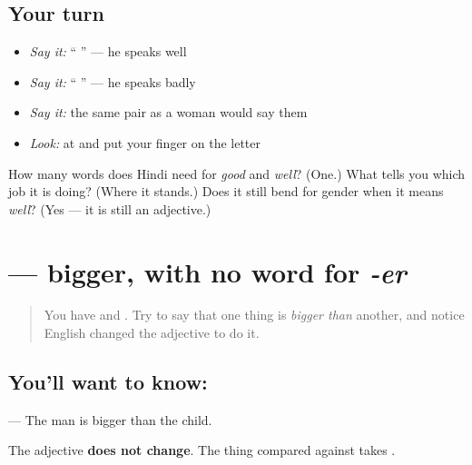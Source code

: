 \subsection*{Your turn}
\begin{itemize}
\raggedright
  \item \emph{Say it:} \textquotedblleft{}   \textquotedblright{} — he speaks well
  \item \emph{Say it:} \textquotedblleft{}   \textquotedblright{} — he speaks badly
  \item \emph{Say it:} the same pair as a woman would say them
  \item \emph{Look:} at  and put your finger on the letter \textbf{}
\end{itemize}

\begin{tcolorbox}[breakable,colback=teal!4,colframe=teal!35!black,title={Before you move on}]
How many words does Hindi need for \emph{good} and \emph{well}? (One.) What tells you which job it is doing? (Where it stands.) Does it still bend for gender when it means \emph{well}? (Yes — it is still an adjective.)
\end{tcolorbox}
\section[\texorpdfstring{\hi{से} \hi{बड़ा} (se baṛā)}{से बड़ा (se baṛā)}]{  — bigger, with no word for \emph{-er}}

\label{lesson:HI-C92-se-comparison}



\begin{quote}
You have \textbf{} and \textbf{}. Try to say that one thing is \emph{bigger than} another, and notice English changed the adjective to do it.
\end{quote}

\subsection*{You'll want to know:  }
\textbf{    } — The man is bigger than the child.

The adjective \textbf{does not change}. The thing compared against takes \textbf{}.

